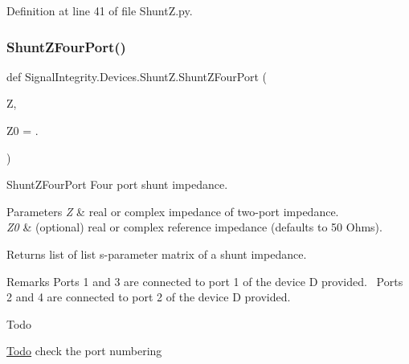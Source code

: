 Definition at line 41 of file Shunt\+Z.\+py.

\mbox{\label{namespaceSignalIntegrity_1_1Devices_1_1ShuntZ_a071383dcde5ba797b9f5882b739c77ee}} 
\subsubsection{\texorpdfstring{Shunt\+Z\+Four\+Port()}{ShuntZFourPort()}}
{\footnotesize\ttfamily def Signal\+Integrity.\+Devices.\+Shunt\+Z.\+Shunt\+Z\+Four\+Port (\begin{DoxyParamCaption}\item[{}]{Z,  }\item[{}]{Z0 = {.} }\end{DoxyParamCaption})}



Shunt\+Z\+Four\+Port Four port shunt impedance. 


\begin{DoxyParams}{Parameters}
{\em Z} & real or complex impedance of two-\/port impedance. \\
\hline
{\em Z0} & (optional) real or complex reference impedance (defaults to 50 Ohms). \\
\hline
\end{DoxyParams}
\begin{DoxyReturn}{Returns}
list of list s-\/parameter matrix of a shunt impedance.~\newline
 
\end{DoxyReturn}
\begin{DoxyRemark}{Remarks}
Ports 1 and 3 are connected to port 1 of the device D provided.~\newline
 Ports 2 and 4 are connected to port 2 of the device D provided.~\newline

\end{DoxyRemark}
\begin{DoxyRefDesc}{Todo}
\item[\hyperlink{todo__todo000005}{Todo}]check the port numbering \end{DoxyRefDesc}


